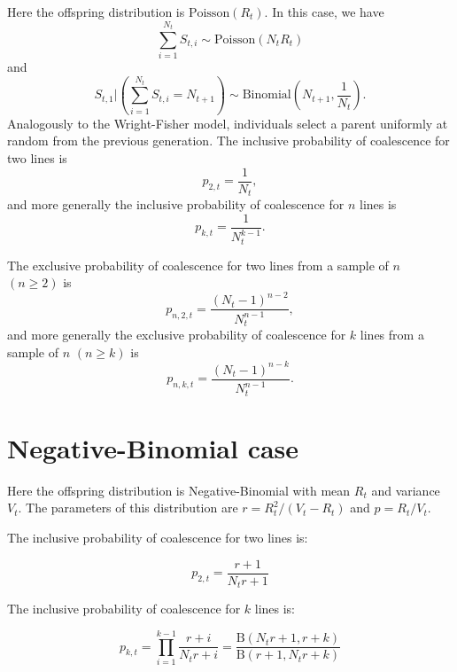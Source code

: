 \documentclass{article}
\begin{document}
Here the offspring distribution is $\text{Poisson}(R_t)$.
In this case, we have 
\begin{equation}
		\sum_{i=1}^{N_t} S_{t,i} \sim \text{Poisson}(N_t R_t)
\end{equation}
and
\begin{equation}
		S_{t,1} | \left(\sum_{i=1}^{N_t} S_{t,i} = N_{t+1}\right) \sim \text{Binomial}\left(N_{t+1}, \frac{1}{N_t}\right).
\end{equation}
Analogously to the Wright-Fisher model, individuals select a parent uniformly at random from the previous generation.
The inclusive probability of coalescence for two lines is
%
\begin{equation}
	p_{2,t}=\frac{1}{N_t},
\end{equation}
and more generally the inclusive probability of coalescence for $n$ lines is
\begin{equation}
	p_{k,t}=\frac{1}{N_t^{k-1}}.
\end{equation}

The exclusive probability of coalescence for two lines from a sample of $n$ $(n \geq 2)$ is
	\begin{equation}
		p_{n,2,t} = \frac{(N_t-1)^{n-2}}{N_t^{n-1}},
	\end{equation}
and more generally the exclusive probability of coalescence for $k$ lines from a sample of $n$ $(n \geq k)$ is
	\begin{equation}
		p_{n,k,t} = \frac{(N_t-1)^{n-k}}{N_t^{n-1}}.
	\end{equation}

\section{Negative-Binomial case}

Here the offspring distribution is Negative-Binomial with mean $R_t$ and variance $V_t$.
The parameters of this distribution are 
$r=R_t^2/(V_t-R_t)$ and $p=R_t/V_t$.

The inclusive probability of coalescence for two lines is:

\begin{equation}
p_{2,t}=\frac{r+1}{N_t r+1}
\end{equation}

The inclusive probability of coalescence for $k$ lines is:

\begin{equation}
p_{k,t}=\prod_{i=1}^{k-1}\frac{r+i}{N_t r+i}=\frac{\mathrm{B}(N_t r+1,r+k)}{\mathrm{B}(r+1,N_t r+k)}
\end{equation}
\end{document}
